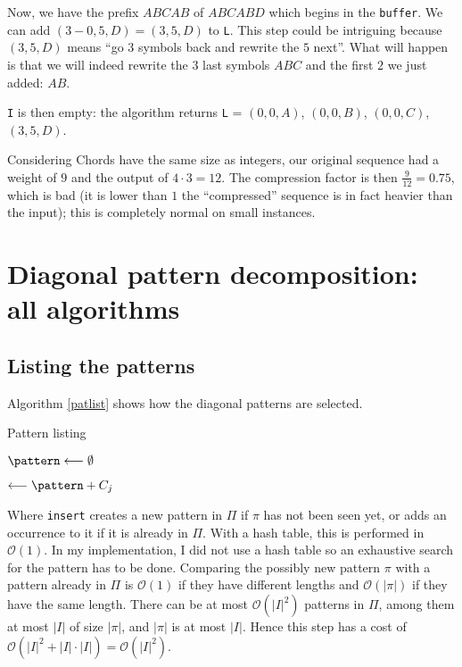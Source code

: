 \documentclass[a4paper,10pt]{article}
\newcommand{\guill}[1]{``#1''}
\newcommand{\bigO}[1]{\mathcal O\left( #1 \right)}
\begin{document}
Now, we have the prefix $ABCAB$ of $ABCABD$ which begins in the \texttt{buffer}. We can add $(3-0,5,D)=(3,5,D)$ to \texttt{L}. This step could be intriguing because $(3,5,D)$ means \guill{go $3$ symbols back and rewrite the $5$ next}. What will happen is that we will indeed rewrite the $3$ last symbols $ABC$ and the first $2$ we just added: $AB$.

\texttt{I} is then empty: the algorithm returns \texttt{L} = $(0,0,A)$, $(0,0,B)$, $(0,0,C)$, $(3,5,D)$.

Considering Chords have the same size as integers, our original sequence had a weight of $9$ and the output of $4\cdot3=12$. The compression factor is then $\frac{9}{12}=0.75$, which is bad (it is lower than $1$ the \guill{compressed} sequence is in fact heavier than the input); this is completely normal on small instances.



\section{Diagonal pattern decomposition: all algorithms}

\subsection*{Listing the patterns}

Algorithm \ref{patlist} shows how the diagonal patterns are selected.

\begin{algorithm}
\caption{Pattern listing \label{patlist}}
    
 


\Debut
{
	 {
		$\pattern \longleftarrow \emptyset$
		
		 {
			 {
				\pattern $\longleftarrow \pattern + C_j$
			}
		}
	}

	\Retour \Pat
}
\end{algorithm}

Where \texttt{insert} creates a new pattern in $\Pi$ if $\pi$ has not been seen yet, or adds an occurrence to it if it is already in $\Pi$. With a hash table, this is performed in $\bigO{1}$. In my implementation, I did not use a hash table so an exhaustive search for the pattern has to be done. Comparing the possibly new pattern $\pi$ with a pattern already in $\Pi$ is $\bigO{1}$ if they have different lengths and $\bigO{|\pi|}$ if they have the same length. There can be at most $\bigO{|I|^2}$ patterns in $\Pi$, among them at most $|I|$ of size $|\pi|$, and $|\pi|$ is at most $|I|$. Hence this step has a cost of $\bigO{|I|^2+|I|\cdot|I|}=\bigO{|I|^2}$.
\end{document}
